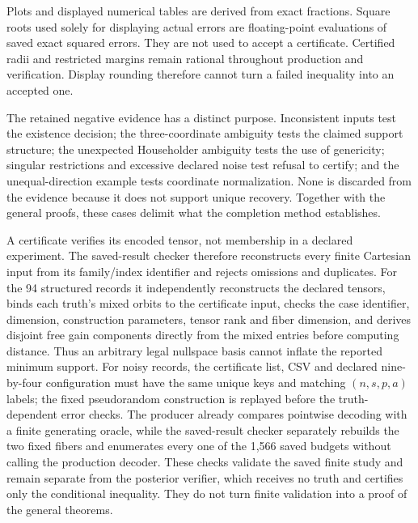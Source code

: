 Plots and displayed numerical tables are derived from exact fractions. Square roots used solely for displaying actual errors are floating-point evaluations of saved exact squared errors. They are not used to accept a certificate. Certified radii and restricted margins remain rational throughout production and verification. Display rounding therefore cannot turn a failed inequality into an accepted one.

The retained negative evidence has a distinct purpose. Inconsistent inputs test the existence decision; the three-coordinate ambiguity tests the claimed support structure; the unexpected Householder ambiguity tests the use of genericity; singular restrictions and excessive declared noise test refusal to certify; and the unequal-direction example tests coordinate normalization. None is discarded from the evidence because it does not support unique recovery. Together with the general proofs, these cases delimit what the completion method establishes.

A certificate verifies its encoded tensor, not membership in a declared experiment. The saved-result checker therefore reconstructs every finite Cartesian input from its family/index identifier and rejects omissions and duplicates. For the 94 structured records it independently reconstructs the declared tensors, binds each truth's mixed orbits to the certificate input, checks the case identifier, dimension, construction parameters, tensor rank and fiber dimension, and derives disjoint free gain components directly from the mixed entries before computing distance. Thus an arbitrary legal nullspace basis cannot inflate the reported minimum support. For noisy records, the certificate list, CSV and declared nine-by-four configuration must have the same unique keys and matching $(n,s,p,a)$ labels; the fixed pseudorandom construction is replayed before the truth-dependent error checks. The producer already compares pointwise decoding with a finite generating oracle, while the saved-result checker separately rebuilds the two fixed fibers and enumerates every one of the 1,566 saved budgets without calling the production decoder. These checks validate the saved finite study and remain separate from the posterior verifier, which receives no truth and certifies only the conditional inequality. They do not turn finite validation into a proof of the general theorems.
